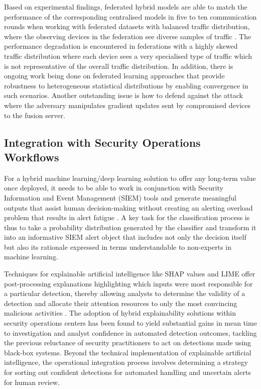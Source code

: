 \documentclass[12pt]{article}
\begin{document}
Based on experimental findings, federated hybrid models are able to match the performance of the corresponding centralised models in five to ten communication rounds when working with federated datasets with balanced traffic distribution, where the observing devices in the federation see diverse samples of traffic \cite{nguyen2019diot}. The performance degradation is encountered in federations with a highly skewed traffic distribution where each device sees a very specialised type of traffic which is not representative of the overall traffic distribution. In addition, there is ongoing work being done on federated learning approaches that provide robustness to heterogeneous statistical distributions by enabling convergence in such scenarios. Another outstanding issue is how to defend against the attack where the adversary manipulates gradient updates sent by compromised devices to the fusion server.

\subsection{Integration with Security Operations Workflows}

For a hybrid machine learning/deep learning solution to offer any long-term value once deployed, it needs to be able to work in conjunction with Security Information and Event Management (SIEM) tools and generate meaningful outputs that assist human decision-making without creating an alerting overload problem that results in alert fatigue \cite{ferrag2020deep}. A key task for the classification process is thus to take a probability distribution generated by the classifier and transform it into an informative SIEM alert object that includes not only the decision itself but also its rationale expressed in terms understandable to non-experts in machine learning.

Techniques for explainable artificial intelligence like SHAP values and LIME offer post-processing explanations highlighting which inputs were most responsible for a particular detection, thereby allowing analysts to determine the validity of a detection and allocate their attention resources to only the most convincing malicious activities \cite{xiao2019iot}. The adoption of hybrid explainability solutions within security operations centers has been found to yield substantial gains in mean time to investigation and analyst confidence in automated detection outcomes, tackling the previous reluctance of security practitioners to act on detections made using black-box systems. Beyond the technical implementation of explainable artificial intelligence, the operational integration process involves determining a strategy for sorting out confident detections for automated handling and uncertain alerts for human review.
\end{document}
